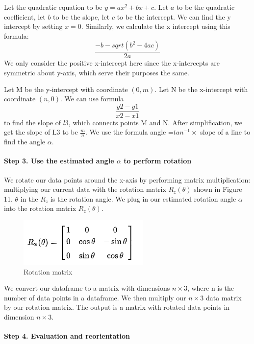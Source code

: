 \documentclass[10pt,letterpaper]{article}
\begin{document}
Let the quadratic equation to be \(y=ax^2 + bx +c\). Let \(a\) to be the
quadratic coefficient, let \(b\) to be the slope, let \(c\) to be the
intercept. We can find the y intercept by setting \(x=0\). Similarly, we
calculate the x intercept using this formula:
\[\frac{-b-sqrt(b^2-4ac)}{2a}\] We only consider the positive
x-intercept here since the x-intercepts are symmetric about y-axis,
which serve their purposes the same.

Let M be the y-intercept with coordinate \((0, m)\). Let N be the
x-intercept with coordinate \((n, 0)\). We can use formula
\[\frac{y2-y1}{x2-x1}\] to find the slope of \(l3\), which connects
points M and N. After simplification, we get the slope of L3 to be
\(\frac{m}{n}\). We use the formula angle =\(tan^{-1} \times\) slope of
a line to find the angle \(\alpha\).

\hypertarget{step-3.-use-the-estimated-angle-alpha-to-perform-rotation}{%
\paragraph{\texorpdfstring{Step 3. Use the estimated angle \(\alpha\) to
perform
rotation}{Step 3. Use the estimated angle \textbackslash{}alpha to perform rotation}}\label{step-3.-use-the-estimated-angle-alpha-to-perform-rotation}}

We rotate our data points around the x-axis by performing matrix
multiplication: multiplying our current data with the rotation matrix
\(R_z(\theta)\) shown in Figure 11. \(\theta\) in the \(R_z\) is the
rotation angle. We plug in our estimated rotation angle \(\alpha\) into
the rotation matrix \(R_z(\theta)\).

\begin{figure}[H]
\includegraphics[width=0.3\linewidth]{visualization_paper/rotation_matrix} \caption{Rotation matrix}\label{fig:Figure11}
\end{figure}

We convert our dataframe to a matrix with dimensions \(n \times 3\),
where n is the number of data points in a dataframe. We then multiply
our \(n \times 3\) data matrix by our rotation matrix. The output is a
matrix with rotated data points in dimension \(n \times 3\).

\hypertarget{step-4.-evaluation-and-reorientation}{%
\paragraph{Step 4. Evaluation and
reorientation}\label{step-4.-evaluation-and-reorientation}}
\end{document}

